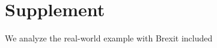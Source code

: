 \documentclass[11pt]{article}
\def\t#1{\tilde{#1}} %
\theoremstyle{definition}
\begin{document}

\section{Supplement}

We analyze the real-world example with Brexit included

\clearpage




  
\end{document}

